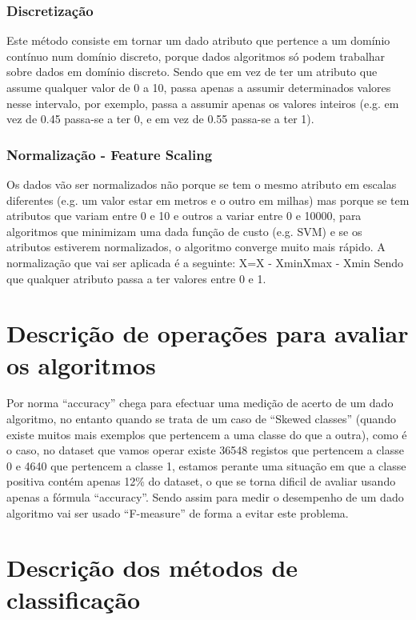 \documentclass[portugues,final]{revdetua}
\begin{document}
\subsubsection{Discretização}

Este método consiste em tornar um dado atributo que pertence a um domínio contínuo num domínio discreto, porque dados algoritmos só podem trabalhar sobre dados em domínio discreto. Sendo que em vez de ter um atributo que assume qualquer valor de 0 a 10, passa apenas a assumir determinados valores nesse intervalo, por exemplo, passa a assumir apenas os valores inteiros (e.g. em vez de 0.45 passa-se a ter 0, e em vez de 0.55 passa-se a ter 1).

\subsubsection{Normalização - Feature Scaling}

Os dados vão ser normalizados não porque se tem o mesmo atributo em escalas diferentes (e.g. um valor estar em metros e o outro em milhas) mas porque se tem atributos que variam entre 0 e 10 e outros a variar entre 0 e 10000, para algoritmos que minimizam uma dada função de custo (e.g. SVM) e se os atributos estiverem normalizados, o algoritmo converge muito mais rápido.
A normalização que vai ser aplicada é a seguinte: X=X - XminXmax - Xmin
Sendo que qualquer atributo passa a ter valores entre 0 e 1.

\section{Descrição de operações para avaliar os algoritmos}

Por norma “accuracy” chega para efectuar uma medição de acerto de um dado algoritmo, no entanto quando se trata de um caso de “Skewed classes” (quando existe muitos mais exemplos que pertencem a uma classe do que a outra), como é o caso, no dataset que vamos operar existe 36548 registos que pertencem a classe 0 e 4640 que pertencem a classe 1, estamos perante uma situação em que a classe positiva contém apenas 12\% do dataset, o que se torna dificil de avaliar usando apenas a fórmula “accuracy”.
Sendo assim para medir o desempenho de um dado algoritmo vai ser usado “F-measure” de forma a evitar este problema.

\section{Descrição dos métodos de classificação}
\end{document}
